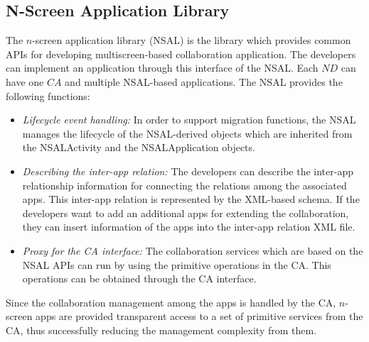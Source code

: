 \documentclass[conference]{IEEEtran}
\newcommand{\bi}{\begin{itemize}}
\newcommand{\ei}{\end{itemize}}
\newcommand{\ii}{\item}
\begin{document}
\subsection{N-Screen Application Library}
The $n$-screen application library (NSAL) is the library which provides common APIs for developing multiscreen-based collaboration application. The developers can implement an application through this interface of the NSAL. Each $ND$ can have one $CA$ and multiple NSAL-based applications. The NSAL provides the following functions:
\bi
\ii \textit{Lifecycle event handling: } In order to support migration functions, the NSAL manages the lifecycle of the NSAL-derived objects which are inherited from the NSALActivity and the NSALApplication objects. 
\ii \textit{Describing the inter-app relation:} The developers can describe the inter-app relationship information for connecting the relations among the associated apps. This inter-app relation is represented by the XML-based schema. If the developers want to add an additional apps for extending the collaboration, they can insert information of the apps into the inter-app relation XML file.
\ii \textit{Proxy for the CA interface: } The collaboration services which are based on the NSAL APIs can run by using the primitive operations in the CA. This operations can be obtained through the CA interface. 
\ei 
Since the collaboration management among the apps is handled by the CA, 
$n$-screen apps are provided transparent access to a set of primitive services from the CA, thus successfully reducing the management complexity from them.
\end{document}
